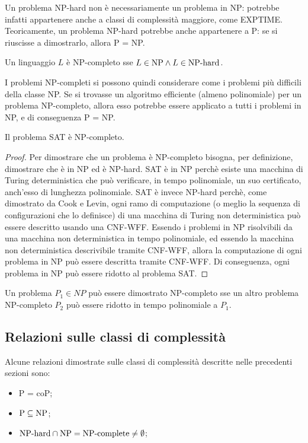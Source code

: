 Un problema NP-hard non è necessariamente un problema in NP: potrebbe infatti appartenere anche a classi di complessità maggiore, come EXPTIME. Teoricamente, un problema NP-hard potrebbe anche appartenere a P: se si riuscisse a dimostrarlo, allora P = NP.

\begin{defn}
    Un linguaggio $L$ è NP-completo sse $L \in \textnormal{NP} \land L \in \textnormal{NP-hard}$.
\end{defn}

I problemi NP-completi si possono quindi considerare come i problemi più difficili della classe NP.
Se si trovasse un algoritmo efficiente (almeno polinomiale) per un problema NP-completo, allora esso potrebbe essere applicato a tutti i problemi in NP, e di conseguenza P = NP.

\begin{thm}
    Il problema SAT è NP-completo.    
\end{thm}
\begin{proof}
    Per dimostrare che un problema è NP-completo bisogna, per definizione, dimostrare che è in NP ed è NP-hard.
    SAT è in NP perchè esiste una macchina di Turing deterministica che può verificare, in tempo polinomiale, un suo certificato, anch'esso di lunghezza polinomiale.
    SAT è invece NP-hard perchè, come dimostrato da Cook e Levin, ogni ramo di computazione (o meglio la sequenza di configurazioni che lo definisce) di una macchina di Turing non deterministica può essere descritto usando una CNF-WFF.
    Essendo i problemi in NP risolvibili da una macchina non deterministica in tempo polinomiale, ed essendo la macchina non deterministica descrivibile tramite CNF-WFF, allora la computazione di ogni problema in NP può essere descritta tramite CNF-WFF.
    Di conseguenza, ogni problema in NP può essere ridotto al problema SAT.
\end{proof}

\begin{rem}
    Un problema $P_1 \in NP$ può essere dimostrato NP-completo sse un altro problema NP-completo $P_2$ può essere ridotto in tempo polinomiale a $P_1$.
\end{rem}

\subsection*{Relazioni sulle classi di complessità}
Alcune relazioni dimostrate sulle classi di complessità descritte nelle precedenti sezioni sono:
\begin{itemize}
    \item P = coP;
    \item $\textnormal{P} \subseteq \textnormal{NP}$;
    \item $\textnormal{NP-hard} \cap \textnormal{NP} = \textnormal{NP-complete} \neq \emptyset$;
\end{itemize}


